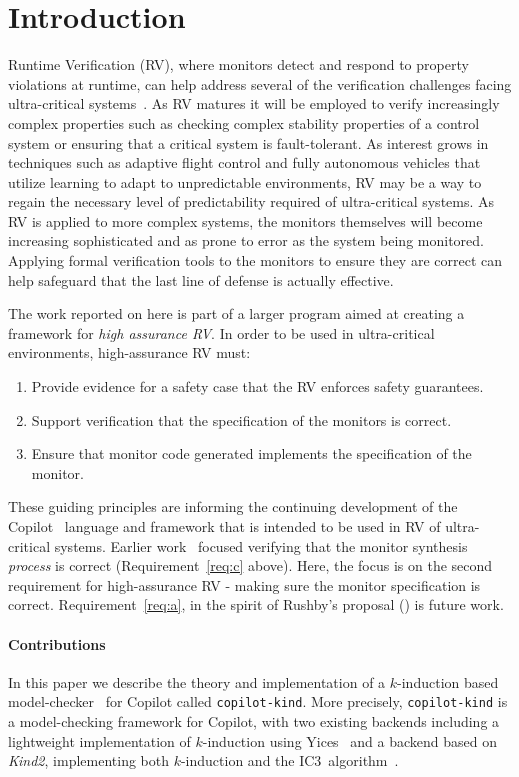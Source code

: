 \section{Introduction}\label{sec:intro}
Runtime Verification (RV), where monitors detect and respond to
property violations at runtime, can help address several of the
verification challenges facing ultra-critical
systems~\cite{pike-rv-11,rvRushby}.  As RV matures it will be employed to
verify increasingly complex properties such as checking complex
stability properties of a control system or ensuring that a critical
system is fault-tolerant. As interest grows in techniques
such as adaptive flight control and fully autonomous vehicles that
utilize learning to adapt to unpredictable environments, RV may be a
way to regain the necessary level of predictability required of
ultra-critical systems.  As RV is applied to more complex systems, the
monitors themselves will become increasing sophisticated and as prone to error
as the system being monitored.  Applying formal verification
tools to the monitors to ensure they are correct can help safeguard
that the last line of defense is actually effective.

 The work reported on here is part of a larger
program aimed at creating a framework for \emph{high assurance RV}. In
order to be used in ultra-critical environments, high-assurance RV
must:
\begin{enumerate}
\item \label{req:a} Provide evidence for a safety case that the RV enforces safety guarantees.
\item \label{req:b} Support verification that the specification of the monitors
  is correct.
\item \label{req:c} Ensure that monitor code generated implements the specification of the
monitor.
\end{enumerate}

\noindent
These guiding principles are informing the continuing development of the
Copilot~\cite{copilot,pike-isse-13} language and framework that is intended to
be used in RV of ultra-critical systems.  Earlier work~\cite{pike-icfp-12}
focused verifying that the monitor synthesis \emph{process} is correct
(Requirement~\ref{req:c} above). Here, the focus
is on the second requirement for high-assurance RV - making sure the monitor
specification is correct. Requirement~\ref{req:a}, in the spirit of Rushby's
proposal (\cite{rvRushby}) is future work.

\paragraph{Contributions}
In this paper we describe the theory and implementation of a $k$-induction based
model-checker~\cite{Sheeran00,EenS03} for Copilot called
\texttt{copilot-kind}. More precisely, \texttt{copilot-kind} is a model-checking
framework for Copilot, with two existing backends including a lightweight
implementation of $k$-induction using Yices~\cite{} and a backend based on
\emph{Kind2}, implementing both $k$-induction and the IC3~algorithm~\cite{}.

